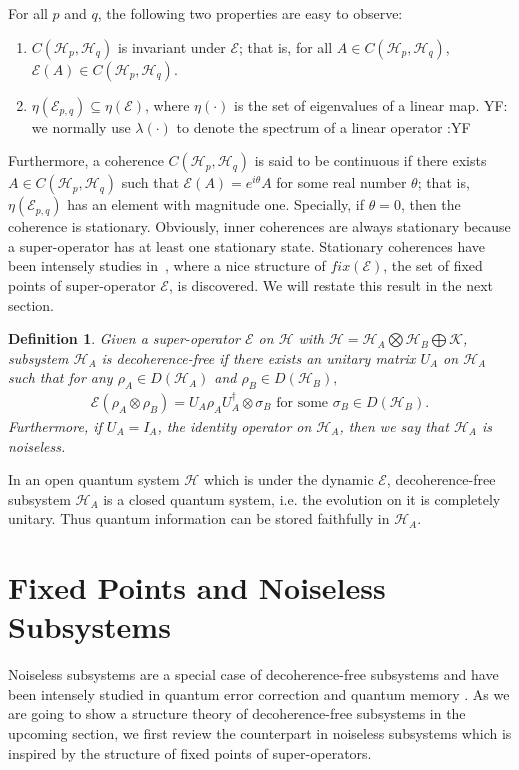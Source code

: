 \documentclass[journal]{IEEEtran}
\def\h{\ensuremath{\mathcal{H}}}
\def\k{\ensuremath{\mathcal{K}}}
\def\e{\ensuremath{\mathcal{E}}}
\def\k{\mathcal{K}}
\newtheorem{definition}{Definition}
\newcommand{\authorComment}[3]{\color{#1}#2: {#3} :#2\color{black}}
\newcommand{\yf}[1]{\authorComment{blue}{YF}{#1}}
\begin{document}
For all $p$ and $q$, the following two properties are easy to observe:
\begin{enumerate}
\item $C(\h_p,\h_q)$ is invariant under $\e$; that is, for all $A\in C(\h_p,\h_q)$, $\e(A)\in C(\h_p,\h_q)$.
\item  $\eta(\e_{p,q})\subseteq \eta(\e)$, where $\eta(\cdot)$ is the set of eigenvalues of a linear map. \yf{we normally use $\lambda(\cdot)$ to denote the spectrum of a linear operator}
\end{enumerate}
Furthermore, a coherence $C(\h_p,\h_q)$ is said to be continuous  if there exists $A\in C(\h_p,\h_q)$ such that $\e(A)=e^{i\theta}A$ for some real number $\theta$; that is, $\eta(\e_{p,q})$ has an element with magnitude one.  Specially, if $\theta=0$, then the coherence is stationary. Obviously, inner coherences are always stationary because a super-operator has at least one stationary state. Stationary coherences have been intensely studies in~\cite{baumgartner2012structure}, where a nice structure of $fix(\e)$, the set of fixed points of super-operator $\e$, is discovered. We will restate this result in the next section.
\begin{definition}\label{def_dfs}
  Given a super-operator $\e$ on $\h$ with $\h=\h_A\bigotimes \h_B\bigoplus\k$, subsystem $\h_A$ is decoherence-free if there exists an unitary matrix $U_A$ on $\h_A$ such that for any $\rho_A\in D(\h_A)$ and $\rho_B\in D(\h_B),$
  \begin{eqnarray}\label{eq_dfs_def}
    \e(\rho_A\otimes\rho_B)=U_A\rho_{A}U_A^\dagger\otimes \sigma_B \textrm{ for some } \sigma_B\in D(\h_B).
  \end{eqnarray}
  Furthermore, if $U_A=I_A$, the identity operator on $\h_A$, then we say that $\h_A$ is noiseless.  
\end{definition}

In an open quantum system $\h$ which is under the dynamic $\e$, decoherence-free subsystem $\h_A$ is a closed quantum system, i.e. the evolution on it  is completely unitary. Thus quantum information can be stored faithfully in $\h_A$.
\section{Fixed Points and Noiseless Subsystems}
Noiseless subsystems are a special case of decoherence-free subsystems and have been intensely studied in quantum error correction \cite{kribs2005operator,beny2007generalization} and quantum memory \cite{kuperberg2003capacity}. As we are going to show a structure theory of decoherence-free subsystems in the upcoming section, we first  review the counterpart in noiseless subsystems which is inspired by the structure of fixed points of super-operators. 
\end{document}
